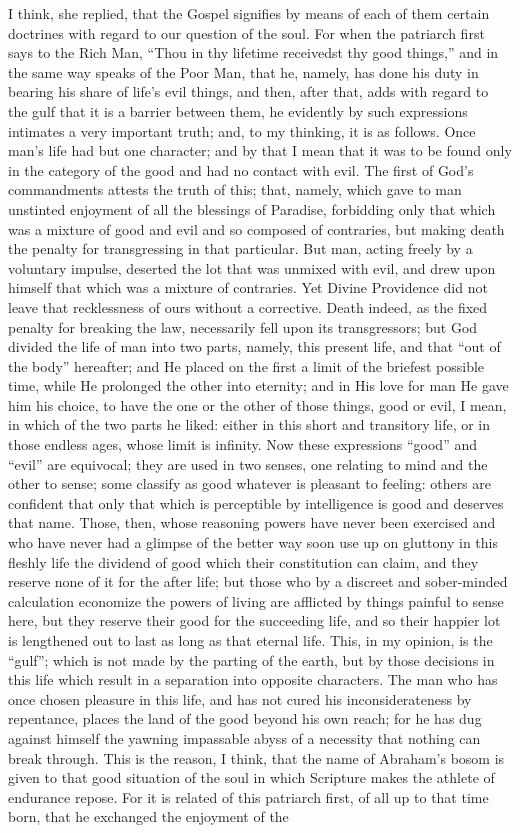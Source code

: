 I think, she replied, that the Gospel signifies by means of each of them certain doctrines with regard to our question of the soul. For when the patriarch first says to the Rich Man, “Thou in thy lifetime receivedst thy good things,” and in the same way speaks of the Poor Man, that he, namely, has done his duty in bearing his share of life’s evil things, and then, after that, adds with regard to the gulf that it is a barrier between them, he evidently by such expressions intimates a very important truth; and, to my thinking, it is as follows. Once man’s life had but one character; and by that I mean that it was to be found only in the category of the good and had no contact with evil. The first of God’s commandments attests the truth of this; that, namely, which gave to man unstinted enjoyment of all the blessings of Paradise, forbidding only that which was a mixture of good and evil and so composed of contraries, but making death the penalty for transgressing in that particular. But man, acting freely by a voluntary impulse, deserted the lot that was unmixed with evil, and drew upon himself that which was a mixture of contraries. Yet Divine Providence did not leave that recklessness of ours without a corrective. Death indeed, as the fixed penalty for breaking the law, necessarily fell upon its transgressors; but God divided the life of man into two parts, namely, this present life, and that “out of the body” hereafter; and He placed on the first a limit of the briefest possible time, while He prolonged the other into eternity; and in His love for man He gave him his choice, to have the one or the other of those things, good or evil, I mean, in which of the two parts he liked: either in this short and transitory life, or in those endless ages, whose limit is infinity. Now these expressions “good” and “evil” are equivocal; they are used in two senses, one relating to mind and the other to sense; some classify as good whatever is pleasant to feeling: others are confident that only that which is perceptible by intelligence is good and deserves that name. Those, then, whose reasoning powers have never been exercised and who have never had a glimpse of the better way soon use up on gluttony in this fleshly life the dividend of good which their constitution can claim, and they reserve none of it for the after life; but those who by a discreet and sober-minded calculation economize the powers of living are afflicted by things painful to sense here, but they reserve their good for the succeeding life, and so their happier lot is lengthened out to last as long as that eternal life. This, in my opinion, is the “gulf”; which is not made by the parting of the earth, but by those decisions in this life which result in a separation into opposite characters. The man who has once chosen pleasure in this life, and has not cured his inconsiderateness by repentance, places the land of the good beyond his own reach; for he has dug against himself the yawning impassable abyss of a necessity that nothing can break through. This is the reason, I think, that the name of Abraham’s bosom is given to that good situation of the soul in which Scripture makes the athlete of endurance repose. For it is related of this patriarch first, of all up to that time born, that he exchanged the enjoyment of the 